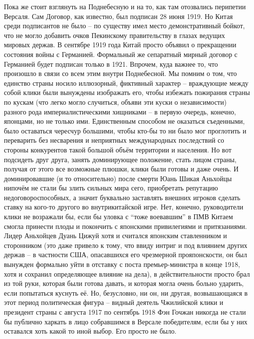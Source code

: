 Пока же стоит взглянуть на Поднебесную и на то, как там отозвались перипетии Версаля. Сам Договор, как известно, был подписан 28 июня 1919. Но Китая среди подписантов не было – по существу имел место демонстративный бойкот, что не могло добавить очков Пекинскому правительству в глазах ведущих мировых держав. В сентябре 1919 года Китай просто объявил о прекращении состояния войны с Германией. Формальный же сепаратный мирный договор с Германией будет подписан только в 1921. Впрочем, куда важнее то, что произошло в связи со всем этим внутри Поднебесной. Мы помним о том, что единство страны носило иллюзорный, фиктивный характер – враждующие между собой клики были вынуждены изображать его, чтобы избежать пожирания страны по кускам (что легко могло случиться, объяви эти куски о независимости) разного рода империалистическими хищниками – в первую очередь, конечно, японцами, но не только ими. Единственным способом не оказаться съеденными, было оставаться чересчур большими, чтобы кто-бы то ни было мог проглотить и переварить без несварения и неприятных международных последствий со стороны конкурентов такой большой объём территории и населения. Но вот подсидеть друг друга, занять доминирующее положение, стать лицом страны, получая от этого все возможные плюшки, клики были готовы и даже очень. И доминировавшие (и то относительно) после смерти Юань Шикая Аньхойцы нипочём не стали бы злить сильных мира сего, приобретать репутацию недоговороспособных, а значит буквально заставлять внешних игроков сделать ставку на кого-то другого во внутрикитайской игре. Нет, конечно, руководители клики не возражали бы, если бы уловка с “тоже воевавшим” в ПМВ Китаем смогла принести плоды и покончить с японскими привилегиями и притязаниями. Лидер Аньхойцев Дуань Цижуй хотя и считался японским ставленником и сторонником (это даже привело к тому, что ввиду интриг и под влиянием других держав – в частности США, опасавшихся его чрезмерной прояпонскости, он был вынужден формально уйти в отставку с поста премьер-министра в конце 1918, хотя и сохранил определяющее влияние на дела), в действительности просто брал из той руки, которая были готова давать, и которая могла очень больно ударить, если попытаться куснуть её. Но, безусловно, ни он, ни другая, возвышающаяся в этот период политическая фигура – видный деятель Чжилийской клики и президент страны с августа 1917 по сентябрь 1918 Фэн Гочжан никогда не стали бы публично харкать в лицо собравшимся в Версале победителям, если бы у них оставался хоть какой то иной выбор. Его просто не было.

